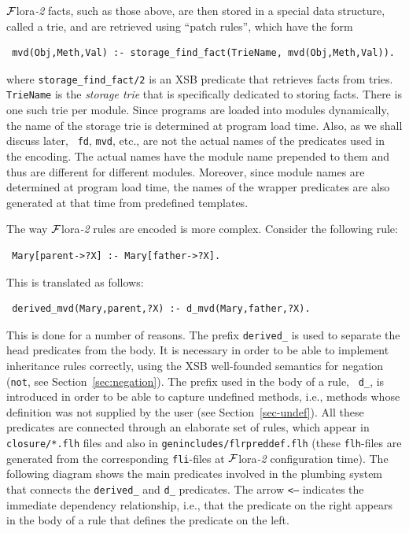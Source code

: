 \documentclass[11pt]{article}
\newcommand{\FLORA}{{\mbox{\sc ${\cal F}${lora}\rm\emph{-2}}}\xspace}
\newcommand{\TNOT}{{{\tt not}}\xspace}
\begin{document}
\FLORA facts, such as those above, are then stored in a special data structure,
called a {\rm trie}, and are retrieved using  ``patch rules'', which have the
form
\begin{verbatim}
 mvd(Obj,Meth,Val) :- storage_find_fact(TrieName, mvd(Obj,Meth,Val)).  
\end{verbatim}
where {\tt storage\_find\_fact/2} is an XSB predicate that retrieves facts
from tries. {\tt TrieName} is the \emph{storage trie} that is specifically
dedicated to storing facts. There is one such trie per module. Since
programs are loaded into modules dynamically, the name of the storage trie
is determined at program load time. Also, as we shall discuss later, {\tt
  fd}, {\tt mvd}, etc., are not the actual names of the predicates used in
the encoding. The actual names have the module name prepended to them and
thus are different for different modules. Moreover, since module names are
determined at program load time, the names of the wrapper predicates are
also generated at that time from predefined templates.

The way \FLORA rules are encoded is more complex. Consider the following rule:
\begin{verbatim}
 Mary[parent->?X] :- Mary[father->?X].  
\end{verbatim}
This is translated as follows:
\begin{verbatim}
 derived_mvd(Mary,parent,?X) :- d_mvd(Mary,father,?X).  
\end{verbatim}
This is done for a number of reasons. The prefix {\tt derived\_} is used to
separate the head predicates from the body. It is necessary in order to
be able to implement inheritance rules correctly, using the XSB
well-founded semantics for negation (\TNOT, see
Section~\ref{sec:negation}). The prefix used in the body of a rule, {\tt
  d\_}, is introduced in order to be able to capture undefined methods,
i.e., methods whose definition was not supplied by the user (see
Section~\ref{sec-undef}). All these predicates are connected through an
elaborate set of rules, which appear in {\tt closure/*.flh} files and also
in {\tt genincludes/flrpreddef.flh} (these {\tt flh}-files are generated
from the corresponding {\tt fli}-files at \FLORA configuration time).
The following diagram shows the main
predicates involved in the plumbing system that connects
the {\tt derived\_} and {\tt d\_} predicates. The arrow {\tt <---} indicates the
immediate dependency relationship, i.e., that the predicate on the
right appears in the body of a rule that defines the predicate on the left.
\end{document}

